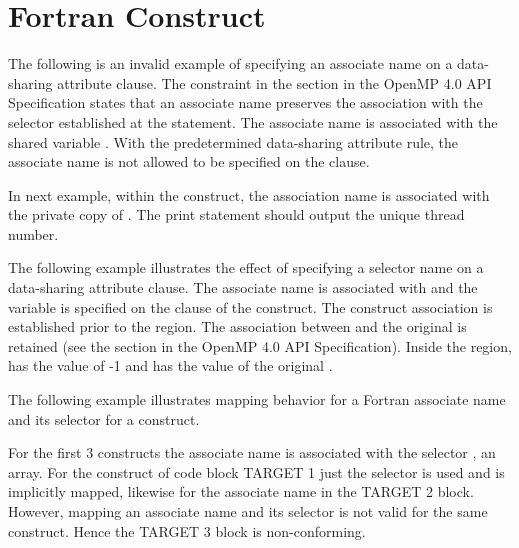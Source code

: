 \section{Fortran  Construct}
\fortranspecificstart
\label{sec:associate}

The following is an invalid example of specifying an associate name on a data-sharing attribute 
clause. The constraint in the  section in the OpenMP 
4.0 API Specification states that an associate name preserves the association
with the selector established at the  statement. The associate 
name  is associated with the shared variable . With the predetermined data-sharing 
attribute rule, the associate name  is not allowed to be specified on the  
clause.

\pagebreak
{}

In next example, within the  construct, the association name  
is associated with the private copy of . The print statement should output the 
unique thread number.


The following example illustrates the effect of specifying a selector name on a data-sharing 
attribute clause. The associate name  is associated with  and the variable  
is specified on the  clause of the  construct. 
The construct association is established prior to the  region. 
The association between  and the original  is retained (see the  section in the OpenMP 4.0 API Specification). Inside the 
region,  has the value of -1 and  has the value of the original .


\label{sec:associate_target}

\bigskip
The following example illustrates mapping behavior for a Fortran
associate name and its selector for a  construct.

For the first 3  constructs the associate name  is
associated with the selector , an array.  
For the  construct of code block TARGET 1 just the selector
 is used and is implicitly mapped,
likewise for the associate name  in the TARGET 2 block.  
However, mapping an associate name and its selector is not valid for the same
 construct.  Hence the TARGET 3 block is non-conforming.


